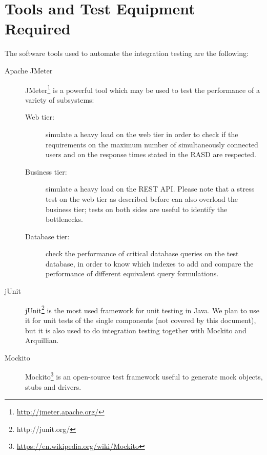 \chapter{Tools and Test Equipment Required}
\label{chap:tools}

The software tools used to automate the integration testing are the following:
\begin{description}
    \item[Apache JMeter
    ]
    JMeter\footnote{\url{http://jmeter.apache.org/}} is a powerful tool which may be used to test the performance of a variety of subsystems:
    \begin{description}
        \item[Web tier:] simulate a heavy load on the web tier in order to check if the requirements on the maximum number of simultaneously connected users and on the response times stated in the RASD %
        are respected.
        \item[Business tier:] simulate a heavy load on the REST API. Please note that a stress test on the web tier as described before can also overload the business tier; tests on both sides are useful to identify the bottlenecks.
        \item[Database tier:] check the performance of critical database queries on the test database, in order to know which indexes to add and compare the performance of different equivalent query formulations.
    \end{description}

    \item[jUnit] jUnit\footnote{http://junit.org/} is the most used framework for unit testing in Java. We plan to use it for unit tests of the single components (not covered by this document), but it is also used to do integration testing together with Mockito and Arquillian.

    \item[Mockito] Mockito\footnote{\url{https://en.wikipedia.org/wiki/Mockito}} is an open-source test framework useful to generate mock objects, stubs and drivers.

\end{description}

